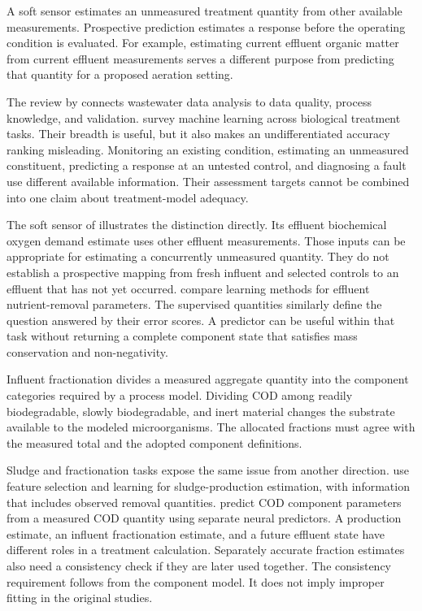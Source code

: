 A soft sensor estimates an unmeasured treatment quantity from other available measurements. Prospective prediction estimates a response before the operating condition is evaluated. For example, estimating current effluent organic matter from current effluent measurements serves a different purpose from predicting that quantity for a proposed aeration setting.

The review by \citet{Newhart2019} connects wastewater data analysis to data quality, process knowledge, and validation. \citet{Sundui2021} survey machine learning across biological treatment tasks. Their breadth is useful, but it also makes an undifferentiated accuracy ranking misleading. Monitoring an existing condition, estimating an unmeasured constituent, predicting a response at an untested control, and diagnosing a fault use different available information. Their assessment targets cannot be combined into one claim about treatment-model adequacy.

The soft sensor of \citet{Ching2022} illustrates the distinction directly. Its effluent biochemical oxygen demand estimate uses other effluent measurements. Those inputs can be appropriate for estimating a concurrently unmeasured quantity. They do not establish a prospective mapping from fresh influent and selected controls to an effluent that has not yet occurred. \citet{ManavDemir2024} compare learning methods for effluent nutrient-removal parameters. The supervised quantities similarly define the question answered by their error scores. A predictor can be useful within that task without returning a complete component state that satisfies mass conservation and non-negativity.

Influent fractionation divides a measured aggregate quantity into the component categories required by a process model. Dividing COD among readily biodegradable, slowly biodegradable, and inert material changes the substrate available to the modeled microorganisms. The allocated fractions must agree with the measured total and the adopted component definitions.

Sludge and fractionation tasks expose the same issue from another direction. \citet{Ekinci2023} use feature selection and learning for sludge-production estimation, with information that includes observed removal quantities. \citet{Wang2024} predict COD component parameters from a measured COD quantity using separate neural predictors. A production estimate, an influent fractionation estimate, and a future effluent state have different roles in a treatment calculation. Separately accurate fraction estimates also need a consistency check if they are later used together. The consistency requirement follows from the component model. It does not imply improper fitting in the original studies.

